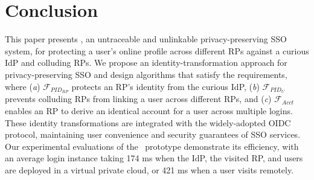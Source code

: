 \section{Conclusion}
\label{sec:conclusion}
This paper presents \usso, an untraceable and unlinkable privacy-preserving SSO system, for protecting a user's online profile across different RPs against a curious IdP and colluding RPs. We propose an identity-transformation approach for privacy-preserving SSO and design algorithms that satisfy the requirements, where (\emph{a}) $\mathcal{F}_{PID_{RP}}$ protects an RP's identity from the curious IdP, (\emph{b}) $\mathcal{F}_{PID_{U}}$ prevents colluding RPs from linking a user across different RPs, and (\emph{c}) $\mathcal{F}_{Acct}$ enables an RP to derive an identical account for a user across multiple logins. These identity transformations are integrated with the widely-adopted OIDC protocol, maintaining user convenience and security guarantees of SSO services. Our experimental evaluations of the \usso~prototype demonstrate its efficiency, with an average login instance taking 174 ms when the IdP, the visited RP, and users are deployed in a virtual private cloud, or 421 ms when a user visits remotely.

